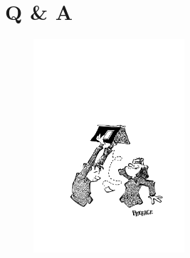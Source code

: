 \documentclass{beamer}
\begin{document}
\section{Q \& A}
\begin{frame}
\begin{figure}
\includegraphics[width=0.5\textwidth]{qanda.pdf}
\end{figure}
\end{frame}
\end{document}

